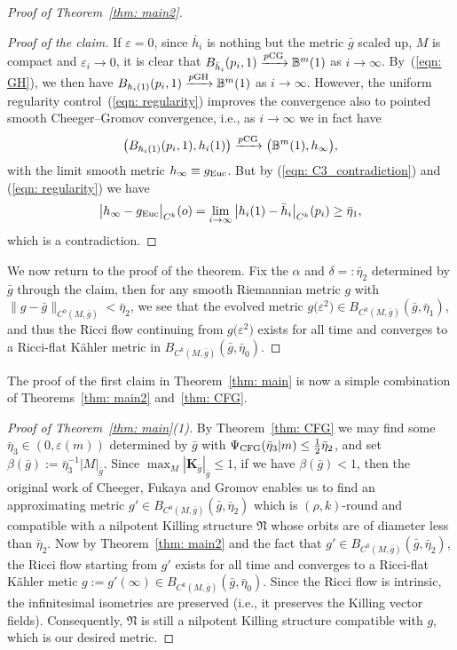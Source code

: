 \documentclass[10pt,a4paper]{amsart}
\numberwithin{equation}{section}
\begin{document}
\begin{proof}[Proof of Theorem~\ref{thm: main2}]
\begin{proof}[Proof of the claim]
If $\varepsilon=0$, since $\bar{h}_i$ is nothing but the metric $\bar{g}$ scaled
up, $M$ is compact and $\varepsilon_i\to 0$, it is clear that
$B_{\bar{h}_i}(p_i,1) \xrightarrow{p{\rm CG}} \mathbb{B}^m(1)$ as $i\to \infty$. By~(\ref{eqn: GH}), we then have $B_{h_i(1)}(p_i,1) \xrightarrow{p{\rm GH}}
\mathbb{B}^m(1)$ as $i\to \infty$. However, the uniform regularity control~(\ref{eqn: regularity}) improves the convergence also to pointed smooth
Cheeger--Gromov convergence, i.e., as $i\to \infty$ we in fact have
\begin{align*}
\big(B_{h_i(1)}(p_i,1),h_i(1)\big) \xrightarrow{p{\rm CG}} \big(\mathbb{B}^m(1),h_{\infty}\big),
\end{align*}
with the limit smooth metric $h_{\infty}\equiv g_{\rm Euc}$.
But by (\ref{eqn: C3_contradiction}) and (\ref{eqn: regularity}) we have
\begin{align*}
 \big|h_{\infty}-g_{\rm Euc} \big|_{C^k}(o) = \lim_{i\to\infty}
 \big|h_i(1)-\bar{h}_i \big|_{C^k}(p_i) \ge \bar{\eta}_1,
\end{align*}
which is a contradiction.
\end{proof}
We now return to the proof of the theorem. Fix the $\alpha$ and
$\delta=:\bar{\eta}_2$ determined by $\bar{g}$ through the claim,
then for any smooth Riemannian metric $g$ with $ \|g-\bar{g}
 \|_{C^0(M,\bar{g})}<\bar{\eta}_2$, we see that the evolved metric
$g\big(\varepsilon^2\big)\in B_{C^k(M,\bar{g})}(\bar{g},\bar{\eta}_1)$, and thus the
Ricci flow continuing from $g\big(\varepsilon^2\big)$ exists for all time and converges
to a Ricci-flat K\"ahler metric in $B_{C^k(M,\bar{g})}(\bar{g},\bar{\eta}_0)$.
\end{proof}


The proof of the first claim in Theorem~\ref{thm: main} is now a simple
combination of Theorems~\ref{thm: main2} and~\ref{thm: CFG}.
 \begin{proof}[Proof of Theorem~\ref{thm: main}(1)]
By Theorem~\ref{thm: CFG} we may find some $\bar{\eta}_3\in (0,\varepsilon(m))$
determined by $\bar{g}$ with $\Psi_{\rm CFG}(\bar{\eta}_3|m)\le
\frac{1}{2}\bar{\eta}_2$, and set $\beta(\bar{g}):= \bar{\eta}_3^{-1}|
M|_{\bar{g}}$. Since $\max_M\left|\mathbf{K}_{\bar{g}} \right|_{\bar{g}}\le 1$,
if we have $\beta(\bar{g})<1$, then the original work of Cheeger, Fukaya and
Gromov enables us to find an approximating metric $g' \in
B_{C^0(M,\bar{g})}\left(\bar{g}, \bar{\eta}_2\right)$ which is $(\rho,k)$-round
and compatible with a nilpotent Killing structure $\mathfrak{N}$ whose orbits
are of diameter less than $\bar{\eta}_2$. Now by Theorem~\ref{thm: main2} and
the fact that $g'\in B_{C^0(M,\bar{g})}(\bar{g}, \bar{\eta}_2)$, the Ricci flow
starting from $g'$ exists for all time and converges to a Ricci-flat K\"ahler
metic $g:=g'(\infty)\in B_{C^k(M,\bar{g})} (\bar{g},\bar{\eta}_0)$. Since the
Ricci flow is intrinsic, the infinitesimal isometries are preserved (i.e., it
preserves the Killing vector fields). Consequently, $\mathfrak{N}$ is still a
nilpotent Killing structure compatible with $g$, which is our desired metric.
\end{proof}
\end{document}
